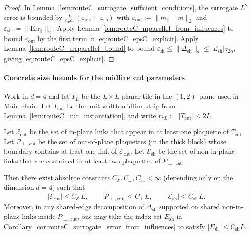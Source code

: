 \begin{proof}
In Lemma~\ref{lem:routeC_surrogate_sufficient_conditions}, the surrogate $L^2$ error is bounded by
\(\tfrac{6}{c_\Psi c_m}(\varepsilon_{\mathrm{out}}+\varepsilon_{\mathrm{sh}})\)
with $\varepsilon_{\mathrm{out}}:=\|m_\parallel-\bar m\|_2$ and $\varepsilon_{\mathrm{sh}}:=\|\mathrm{Err}_\parallel\|_2$.
Apply Lemma~\ref{lem:routeC_mparallel_from_influences} to bound $\varepsilon_{\mathrm{out}}$ by the first term in \eqref{eq:routeC_epsC_explicit}.
Apply Lemma~\ref{lem:routeC_errparallel_bound} to bound $\varepsilon_{\mathrm{sh}}\le \|\Delta_{\mathrm{sh}}\|_2\le |E_{\mathrm{sh}}|z_{2\alpha}$, giving \eqref{eq:routeC_epsC_explicit}.
\end{proof}






\paragraph*{Concrete size bounds for the midline cut parameters}

\begin{lemma}[Midline cut bookkeeping in $d=4$]\label{lem:routeC_midline_bookkeeping}
Work in $d=4$ and let $T_L$ be the $L\times L$ planar tile in the $(1,2)$--plane used in Main chain.
Let $T_{\mathrm{cut}}$ be the unit-width midline strip from Lemma~\ref{lem:routeC_cut_instantiation}, and write
$m_L := |T_{\mathrm{cut}}|\le 2L$.

Let $\mathcal E_{\mathrm{cut}}$ be the set of in-plane links that appear in at least one plaquette of $T_{\mathrm{cut}}$.
Let $P_{\perp,\mathrm{cut}}$ be the set of out-of-plane plaquettes (in the thick block) whose boundary contains at least one link of $\mathcal E_{\mathrm{cut}}$.
Let $\mathcal E_{\mathrm{sh}}$ be the set of non-in-plane links that are contained in at least two plaquettes of $P_{\perp,\mathrm{cut}}$.

Then there exist absolute constants $C_{\mathcal E},C_{\perp},C_{\mathrm{sh}}<\infty$ (depending only on the dimension $d=4$) such that
\begin{equation}\label{eq:routeC_midline_size_bounds}
|\mathcal E_{\mathrm{cut}}|\le C_{\mathcal E}\, L,\qquad
|P_{\perp,\mathrm{cut}}|\le C_{\perp}\, L,\qquad
|\mathcal E_{\mathrm{sh}}|\le C_{\mathrm{sh}}\, L.
\end{equation}
Moreover, in any shared-edge decomposition of $\Delta_{\mathrm{sh}}$ supported on shared non-in-plane links inside $P_{\perp,\mathrm{cut}}$,
one may take the index set $E_{\mathrm{sh}}$ in Corollary~\ref{cor:routeC_surrogate_error_from_influences} to satisfy $|E_{\mathrm{sh}}|\le C_{\mathrm{sh}}L$.
\end{lemma}

